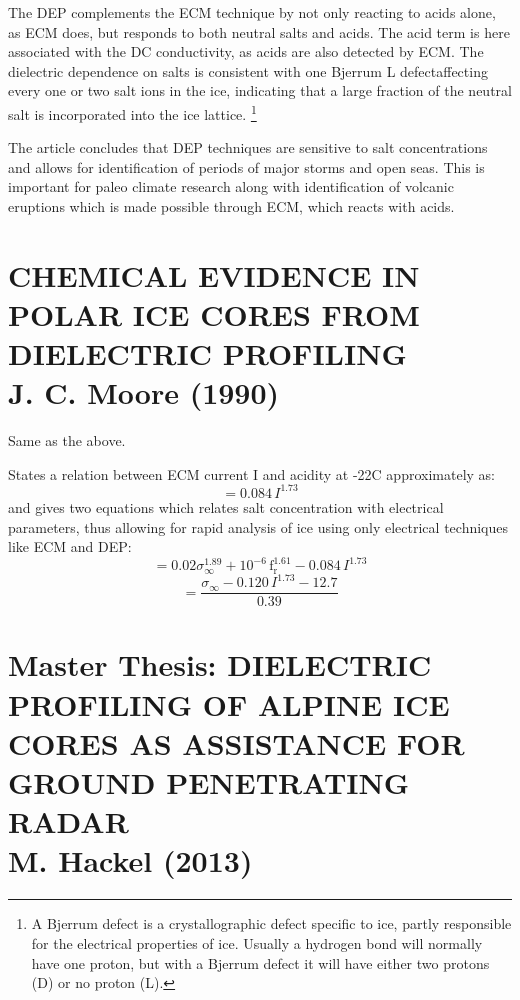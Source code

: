\documentclass[11pt]{article}
\begin{document}
The DEP complements the ECM technique by not only reacting to acids alone, as ECM does, but responds to both neutral salts and acids.
The acid term is here associated with the DC conductivity, as acids are also detected by ECM. The dielectric dependence on salts is consistent with one Bjerrum L defect\footnotemark affecting every one or two salt ions in the ice, indicating that a large fraction of the neutral salt is incorporated into the ice lattice.
\footnote[3]{A Bjerrum defect is a crystallographic defect specific to ice, partly responsible for the electrical properties of ice. Usually a hydrogen bond will normally have one proton, but with a Bjerrum defect it will have either two protons (D) or no proton (L).}

The article concludes that DEP techniques are sensitive to salt concentrations and allows for identification of periods of major storms and open seas. This is important for paleo climate research along with identification of volcanic eruptions which is made possible through ECM, which reacts with acids.

\section{CHEMICAL EVIDENCE IN POLAR ICE CORES FROM DIELECTRIC PROFILING\\ J. C. Moore (1990)}
Same as the above.

States a relation between ECM current I and acidity at -22\degree C approximately as:
\begin{equation}
	[\text{H}^+] = 0.084\, I^{1.73}
\end{equation}
and gives two equations which relates salt concentration with electrical parameters, thus allowing for rapid analysis of ice using only electrical techniques like ECM and DEP:
\begin{equation}
	[\text{salt}] = 0.02\sigma_{\infty}^{1.89} + 10^{-6}\, \text{f}_{\text{r}}^{1.61} - 0.084\, I^{1.73}
\end{equation}
\begin{equation}
	[\text{salt}] = \frac{\sigma_{\infty} - 0.120\, I^{1.73} - 12.7}{0.39}
\end{equation}
\section{Master Thesis: DIELECTRIC PROFILING OF ALPINE ICE CORES AS ASSISTANCE FOR GROUND PENETRATING RADAR \\ M. Hackel (2013)}
\end{document}
